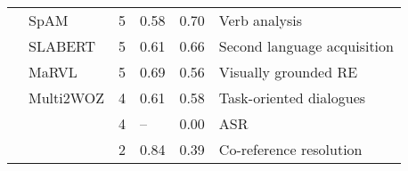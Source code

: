 \begin{tabular}{llrlll}
	\citet{majewska-etal-2020-manual}             & SpAM                   & 5                               & 0.58                            & 0.70                            & Verb analysis                       \\
	\citet{yadavalli-etal-2023-slabert}           & SLABERT                & 5                               & 0.61                            & 0.66                            & Second language acquisition         \\
	\citet{liu-etal-2021-visually}                & MaRVL                  & 5                               & 0.69                            & 0.56                            & Visually grounded RE                \\
	\citet{hung-etal-2022-multi2woz}              & Multi2WOZ              & 4                               & 0.61                            & 0.58                            & Task-oriented dialogues             \\
	\citet{bartelds-etal-2023-making}             &                        & 4                               & --\lowcov                       & \cellcolor{low-color!40}  0.00  & ASR                                 \\
	\citet{sasaki-etal-2002-co}                   &                        & 2                               & \cellcolor{high-color!40}  0.84 & 0.39                            & Co-reference resolution             \\
	\bottomrule
\end{tabular}